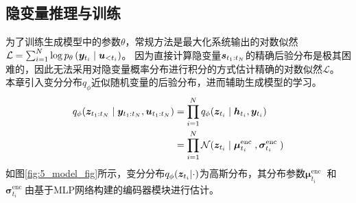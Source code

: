 \subsection{隐变量推理与训练}
为了训练生成模型中的参数$\theta$，常规方法是最大化系统输出的对数似然$\mathcal{L}=\sum_{i=1}^N\log p_{\theta}\left( \boldsymbol{y}_{t_i} \mid  \boldsymbol u_{<t_i}  \right)$。
因为直接计算隐变量$\boldsymbol{s}_{t_1:t_N}$的精确后验分布是极其困难的，因此无法采用对隐变量概率分布进行积分的方式估计精确的对数似然$\mathcal{L}$。
本章引入变分分布$q_\phi$近似随机变量的后验分布，进而辅助生成模型的学习。
\begin{equation}
\begin{aligned}
 q_{\phi}(\boldsymbol z_{t_1:t_N}\mid\boldsymbol y_{t_1:t_N},\boldsymbol u_{t_1:t_N}) &= \prod_{i=1}^{N} q_{\phi}(\boldsymbol z_{t_i}\mid \boldsymbol{h}_{t_i},\boldsymbol{y}_{t_i})\\
 &= \prod_{i=1}^{N} \mathcal{N}(\boldsymbol{z}_{t_i}\mid\boldsymbol{\mu}_{t_i}^{\text {enc }}, \boldsymbol{\sigma}_{t_i}^{\text {enc }})  
 \label{equ:posterior_z}
\end{aligned}
\end{equation}
如图\ref{fig:5_model_fig}所示，变分分布$q_\phi(\boldsymbol{z}_{t_i}|\cdot)$为高斯分布，其分布参数$\boldsymbol{\mu}_{t_i}^{\text {enc }}$ 和 $\boldsymbol{\sigma}_{t_i}^{\text {enc }}$由基于MLP网络构建的编码器模块进行估计。
